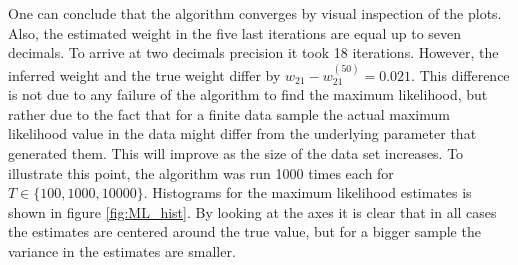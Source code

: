 One can conclude that the algorithm converges by visual inspection of the plots. Also, the estimated weight in the five last iterations are equal up to seven decimals. To arrive at two decimals precision it took 18 iterations. However, the inferred weight and the true weight differ by $w_{21} - w_{21}^{(50)} = 0.021$. This difference is not due to any failure of the algorithm to find the maximum likelihood, but rather due to the fact that for a finite data sample the actual maximum likelihood value in the data might differ from the underlying parameter that generated them. This will improve as the size of the data set increases. To illustrate this point, the algorithm was run 1000 times each for $T \in \{ 100,1000,10000\}$. Histograms for the maximum likelihood estimates is shown in figure \ref{fig:ML_hist}. By looking at the axes it is clear that in all cases the estimates are centered around the true value, but for a bigger sample the variance in the estimates are smaller. 

